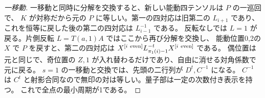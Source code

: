 \begin{proof}[一移動]
一移動と同時に分解を交換すると、新しい能動四テンソルは $P$ の一巡回で、
$K$ が対称だから元の $P$ に等しい。第一の四対応は旧第二の $L_{i+1}$ であり、
これを恒等に戻した後の第二の四対応は $L_{i-1}^{-1}$ である。
反転なしでは $L=1$ が戻る。片側反転 $L=T(a,1)A$ ではここから再び分解を交換し、
能動位置0,2の $X$ で $P$ を戻すと、第二の四対応は
$X^{[i\ {\rm even}]}L_{\pi_1(i)-1}^{-t}X^{[i\ {\rm even}]}$ である。
偶位置は元と同じで、奇位置の $Z,1$ が入れ替わるだけであり、自由に消せる対角係数で元に戻る。
$s=1$ の一移動と交換では、先頭の二行列が $D^t,C^{-1}$ になる。
$C^{-1}$ は $C^t$ と射影合同なので無印の対は等しい。量子部は一定の次数付き表示を持つ。
これで全点の最小周期が1である。
\end{proof}
